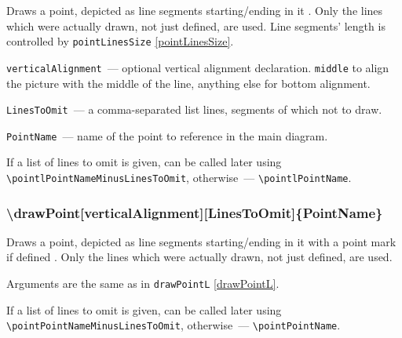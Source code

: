 	Draws a point, depicted as line segments starting/ending in it . Only the lines which were actually drawn, not just defined, are used. Line segments' length is controlled by \texttt{pointLinesSize} \ref{pointLinesSize}.

	\texttt{verticalAlignment}~— optional vertical alignment declaration. \texttt{middle} to align the picture with the middle of the line, anything else for bottom alignment.
	
	\texttt{LinesToOmit}~— a comma-separated list lines, segments of which not to draw. 
	
	\texttt{PointName}~— name of the point to reference in the main diagram. 
	
	If a list of lines to omit is given, can be called later using \texttt{\textbackslash pointlPointNameMinusLinesToOmit}, otherwise~— \texttt{\textbackslash pointlPointName}. 

\subsubsection{\textbackslash drawPoint[verticalAlignment][LinesToOmit]\{PointName\}}

	Draws a point, depicted as line segments starting/ending in it with a point mark if defined . Only the lines which were actually drawn, not just defined, are used.

	Arguments are the same as in \texttt{drawPointL} \ref{drawPointL}.
	
	If a list of lines to omit is given, can be called later using \texttt{\textbackslash pointPointNameMinusLinesToOmit}, otherwise~— \texttt{\textbackslash pointPointName}. 





